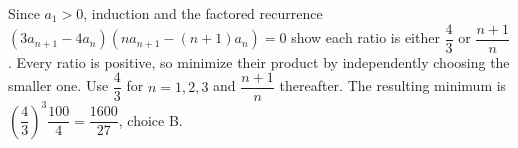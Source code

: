 Since $a_1>0$, induction and the factored recurrence $(3a_{n+1}-4a_n)(na_{n+1}-(n+1)a_n)=0$ show each ratio is either $\dfrac{4}{3}$ or $\dfrac{n+1}{n}$. Every ratio is positive, so minimize their product by independently choosing the smaller one. Use $\dfrac{4}{3}$ for $n=1,2,3$ and $\dfrac{n+1}{n}$ thereafter. The resulting minimum is $(\dfrac{4}{3})^3\dfrac{100}{4}=\boxed{\dfrac{1600}{27}}$, choice B.
